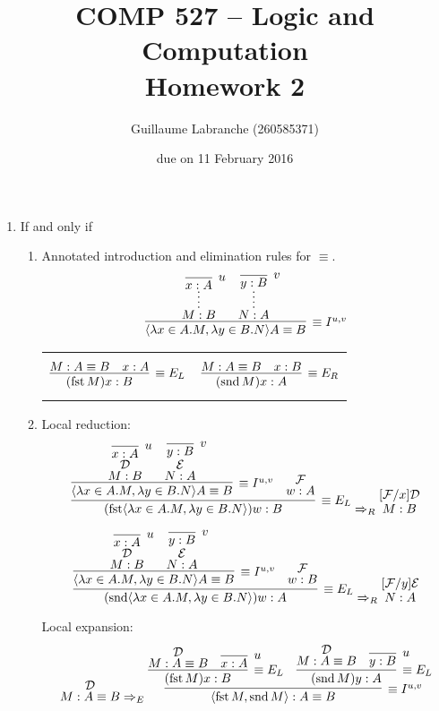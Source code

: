 \documentclass{article}
\author{Guillaume Labranche (260585371)}
\title{COMP 527 -- Logic and Computation\\Homework 2}
\date{due on 11 February 2016}
\DeclareMathOperator{\fst}{fst}
\DeclareMathOperator{\snd}{snd}
\renewcommand{\t}{\text{}}
\begin{document}
\maketitle

\begin{enumerate}[label=\textbf{Exercise \arabic*}]


\item If and only if

\begin{enumerate}[label=\textbf{Task \arabic*},leftmargin=1em]
\item Annotated introduction and elimination rules for $\equiv$.
\[
\infer[\equiv I^{u,v}]
  {\langle \lambda x \in A.M,\lambda y \in B.N \rangle A \equiv B \t}
  {\infer*{M:B\t}{\infer[u]{x:A\t}{}} & \infer*{N:A\t}{\infer[v]{y:B\t}{}}}
\]
\begin{tabular}{cc}
$$
\infer[\equiv E_L]
  {(\fst M) x : B \t}
  {M:A \equiv B \t & x : A \t}
$$
&
$$
\infer[\equiv E_R]
  {(\snd M) x : A \t}
  {M:A \equiv B \t & x : B \t}
$$
\end{tabular}

\item Local reduction: %
\[
\infer[\equiv E_L]
  { (\fst \langle \lambda x \in A.M,\lambda y \in B.N \rangle) w : B \t}
  {\infer[\equiv I^{u,v}]
    {\langle \lambda x \in A.M,\lambda y \in B.N \rangle A \equiv B \t}
    {\deduce[\mathcal{D}]{M:B\t}{\infer[u]{x:A\t}{}}
     & \deduce[\mathcal{E}]{N:A\t}{\infer[v]{y:B\t}{}}
     }
  & \deduce[\mathcal{F}]{w:A \t}{}
  }
\Rightarrow_R
\deduce[{[}\mathcal{F}/x{]}\mathcal{D}]
  {M:B \t}
  {}
\]

\[
\infer[\equiv E_L]
  { (\snd \langle \lambda x \in A.M,\lambda y \in B.N \rangle) w : A \t}
  {\infer[\equiv I^{u,v}]
    {\langle \lambda x \in A.M,\lambda y \in B.N \rangle A \equiv B \t}
    {\deduce[\mathcal{D}]{M:B\t}{\infer[u]{x:A\t}{}}
     & \deduce[\mathcal{E}]{N:A\t}{\infer[v]{y:B\t}{}}
     }
  & \deduce[\mathcal{F}]{w:B \t}{}
  }
\Rightarrow_R
\deduce[{[}\mathcal{F}/y{]}\mathcal{E}]
  {N:A \t}
  {}
\]

Local expansion: %
\[
\deduce[\mathcal{D}]{M : A \equiv B \t}{}
\Rightarrow_E
\infer[\equiv I^{u,v}]
  {\langle \fst M, \snd M \rangle : A \equiv B \t}
  {\infer[\equiv E_L]
    {(\fst M)x : B \t}
    {\deduce[\mathcal{D}]{M : A \equiv B \t}{}
    & \infer[u]{x:A \t}{}}
  &\infer[\equiv E_L]
    {(\snd M)y : A \t}
    {\deduce[\mathcal{D}]{M : A \equiv B \t}{}
    & \infer[u]{y:B \t}{}}
  }
\]


\end{enumerate}
\end{enumerate}
\end{document}

